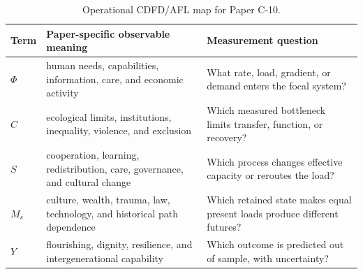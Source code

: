 \documentclass[11pt,a4paper]{article}
\begin{document}
\begin{table}[htbp]
\centering
\small
\caption{Operational CDFD/AFL map for Paper C-10.}
\begin{tabularx}{\textwidth}{|l|X|X|}
\hline
\textbf{Term} & \textbf{Paper-specific observable meaning} & \textbf{Measurement question} \\
\hline
$\Phi$ & human needs, capabilities, information, care, and economic activity & What rate, load, gradient, or demand enters the focal system? \\
\hline
$C$ & ecological limits, institutions, inequality, violence, and exclusion & Which measured bottleneck limits transfer, function, or recovery? \\
\hline
$S$ & cooperation, learning, redistribution, care, governance, and cultural change & Which process changes effective capacity or reroutes the load? \\
\hline
$M_s$ & culture, wealth, trauma, law, technology, and historical path dependence & Which retained state makes equal present loads produce different futures? \\
\hline
$Y$ & flourishing, dignity, resilience, and intergenerational capability & Which outcome is predicted out of sample, with uncertainty? \\
\hline
\end{tabularx}
\end{table}
\end{document}
